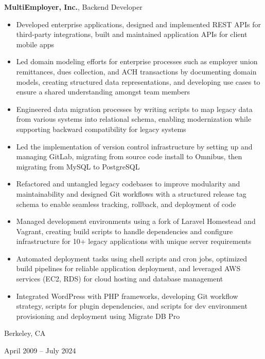 \documentclass[10pt, letterpaper]{article}
\newenvironment{highlights}{
    \begin{itemize}[
        topsep=0.10 cm,
        parsep=0.10 cm,
        partopsep=0pt,
        itemsep=0pt,
        leftmargin=0.4 cm + 10pt
    ]
}{
    \end{itemize}
} %
\newenvironment{twocolentry}[2][]{
    \onecolentry
    \def\secondColumn{#2}
    \setcolumnwidth{\fill, 4.5 cm}
    \begin{paracol}{2}
}{
    \switchcolumn \raggedleft \secondColumn
    \end{paracol}
    \endonecolentry
} %
\begin{document}
        
            \begin{twocolentry}{
                Berkeley, CA

                April 2009 – July 2024
            }
                \textbf{MultiEmployer, Inc.}, Backend Developer
                \begin{highlights}
                    
                        \item Developed enterprise applications, designed and implemented REST APIs for third-party integrations, built and maintained application APIs for client mobile apps
                    
                        \item Led domain modeling efforts for enterprise processes such as employer union remittances, dues collection, and ACH transactions by documenting domain models, creating structured data representations, and developing use cases to ensure a shared understanding amongst team members
                    
                        \item Engineered data migration processes by writing scripts to map legacy data from various systems into relational schema, enabling modernization while supporting backward compatibility for legacy systems
                    
                        \item Led the implementation of version control infrastructure by setting up and managing GitLab, migrating from source code install to Omnibus, then migrating from MySQL to PostgreSQL
                    
                        \item Refactored and untangled legacy codebases to improve modularity and maintainability and designed Git workflows with a structured release tag schema to enable seamless tracking, rollback, and deployment of code
                    
                        \item Managed development environments using a fork of Laravel Homestead and Vagrant, creating build scripts to handle dependencies and configure infrastructure for 10+ legacy applications with unique server requirements
                    
                        \item Automated deployment tasks using shell scripts and cron jobs, optimized build pipelines for reliable application deployment, and leveraged AWS services (EC2, RDS) for cloud hosting and database management
                    
                        \item Integrated WordPress with PHP frameworks, developing Git workflow strategy, scripts for plugin dependencies, and scripts for dev environment provisioning and deployment using Migrate DB Pro
                    
                \end{highlights}
            \end{twocolentry}
        \vspace{0.2 cm}
        
\end{document}
